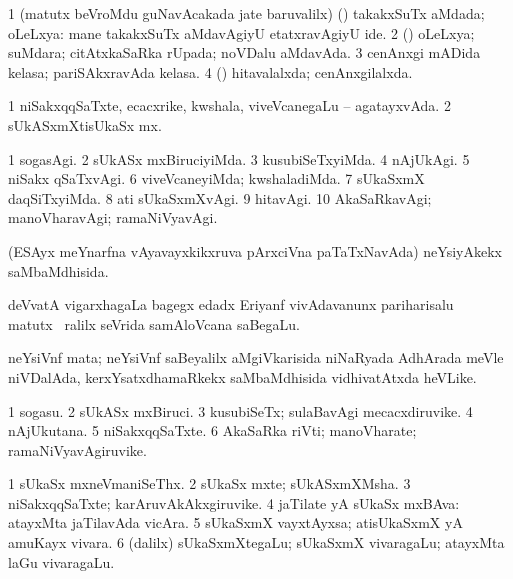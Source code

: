 \noindent
\gl{\pagu}
\bmng
\bnum
\num{1}  (matutx beVroMdu guNavAcakada jate baruvalilx) (\AmA) takakxSuTx aMdada; oLeLxya:  mane takakxSuTx aMdavAgiyU etatxravAgiyU ide. 
\num{2}  (\AmA) oLeLxya; suMdara; citAtxkaSaRka rUpada; noVDalu aMdavAda. 
\num{3}  cenAnxgi mADida kelasa; pariSAkxravAda kelasa. 
\num{4}  (\AmA) hitavalalxda; cenAnxgilalxda. 
\enum
\emng
\eentry

\bentry
{}
\gl{\gu}
\bmng
\bnum
\num{1} niSakxqqSaTxte, ecacxrike, kwshala, viveVcanegaLu -- agatayxvAda. 
\num{2} sUkASxmXtisUkaSx mx. 
\enum
\emng
\eentry

\bentry
{}
\gl{\kirxvi}
\bmng
\bnum
\num{1} sogasAgi. 
\num{2} sUkASx mxBiruciyiMda. 
\num{3} kusubiSeTxyiMda. 
\num{4} nAjUkAgi. 
\num{5} niSakx qSaTxvAgi. 
\num{6} viveVcaneyiMda; kwshaladiMda. 
\num{7} sUkaSxmX daqSiTxyiMda. 
\num{8} ati sUkaSxmXvAgi. 
\num{9} hitavAgi. 
\num{10} AkaSaRkavAgi; manoVharavAgi; ramaNiVyavAgi. 
\enum
\emng
\eentry

\bentry
{}
\gl{\gu}
\bmng
(ESAyx meYnarfna vAyavayxkikxruva pArxciVna paTaTxNavAda) neYsiyAkekx saMbaMdhisida. 
\emng

\noindent
\gl{\pagu}
\bmng
{} deVvatA vigarxhagaLa bagegx edadx Eriyanf vivAdavanunx pariharisalu \kirxpU\  matutx \kirxpU\ ralilx seVrida samAloVcana saBegaLu. 
\emng
\eentry

\bentry
{}
\gl{\nA}
\bmng
neYsiVnf mata; neYsiVnf saBeyalilx aMgiVkarisida niNaRyada AdhArada meVle niVDalAda, kerxYsatxdhamaRkekx saMbaMdhisida vidhivatAtxda heVLike. 
\emng
\eentry

\bentry
{}
\gl{\nA}
\bmng
\bnum
\num{1} sogasu. 
\num{2} sUkASx mxBiruci. 
\num{3} kusubiSeTx; sulaBavAgi mecacxdiruvike. 
\num{4} nAjUkutana. 
\num{5} niSakxqqSaTxte. 
\num{6} AkaSaRka riVti; manoVharate; ramaNiVyavAgiruvike. 
\enum
\emng
\eentry

\bentry
{}
\gl{\nA}
\bmng
\bnum
\num{1} sUkaSx mxneVmaniSeThx. 
\num{2} sUkaSx mxte; sUkASxmXMsha. 
\num{3} niSakxqqSaTxte; karAruvAkAkxgiruvike. 
\num{4} jaTilate yA sUkaSx mxBAva:  atayxMta jaTilavAda vicAra. 
\num{5} sUkaSxmX vayxtAyxsa; atisUkaSxmX yA amuKayx vivara. 
\num{6} (\bava dalilx) sUkaSxmXtegaLu; sUkaSxmX vivaragaLu; atayxMta laGu vivaragaLu. 
\enum
\emng
\eentry

